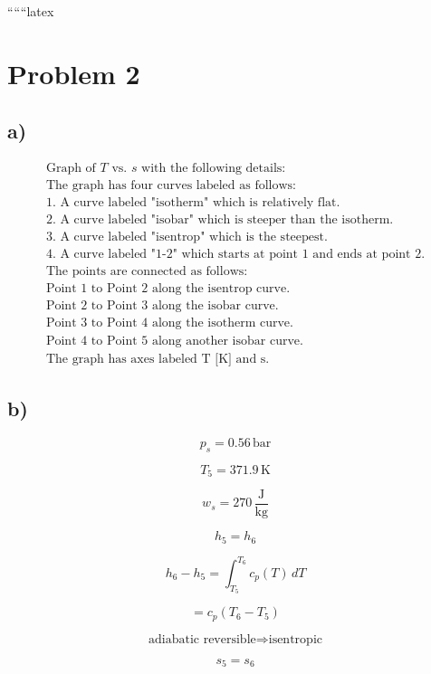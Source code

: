 
``````latex


\section*{Problem 2}

\subsection*{a)}

\[
\begin{array}{c}
\text{Graph of } T \text{ vs. } s \text{ with the following details:} \\
\text{The graph has four curves labeled as follows:} \\
\text{1. A curve labeled "isotherm" which is relatively flat.} \\
\text{2. A curve labeled "isobar" which is steeper than the isotherm.} \\
\text{3. A curve labeled "isentrop" which is the steepest.} \\
\text{4. A curve labeled "1-2" which starts at point 1 and ends at point 2.} \\
\text{The points are connected as follows:} \\
\text{Point 1 to Point 2 along the isentrop curve.} \\
\text{Point 2 to Point 3 along the isobar curve.} \\
\text{Point 3 to Point 4 along the isotherm curve.} \\
\text{Point 4 to Point 5 along another isobar curve.} \\
\text{The graph has axes labeled T [K] and s.}
\end{array}
\]

\subsection*{b)}

\[
p_s = 0.56 \, \text{bar}
\]

\[
T_5 = 371.9 \, \text{K}
\]

\[
w_s = 270 \, \frac{\text{J}}{\text{kg}}
\]

\[
h_5 = h_6
\]

\[
h_6 - h_5 = \int_{T_5}^{T_6} c_p(T) \, dT
\]

\[
= c_p (T_6 - T_5)
\]

\[
\text{adiabatic reversible} \Rightarrow \text{isentropic}
\]

\[
s_5 = s_6
\]

